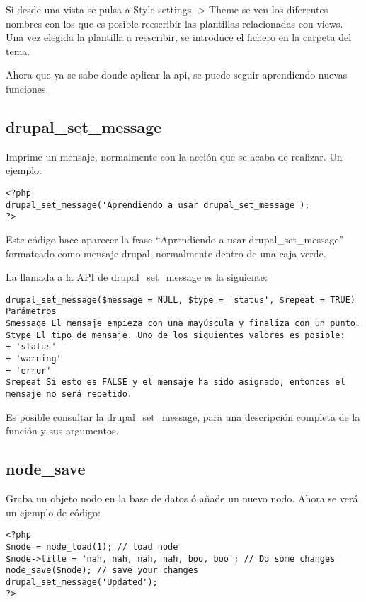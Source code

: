 \documentclass[11pt]{article}
\begin{document}
Si desde una vista se pulsa a Style settings -> Theme se ven los
diferentes nombres con los que es posible reescribir las plantillas
relacionadas con views. Una vez elegida la plantilla a reescribir, se
introduce el fichero en la carpeta del tema.

Ahora que ya se sabe donde aplicar la api, se puede seguir aprendiendo
nuevas funciones.

\subsection{drupal\_set\_message}
\label{sec-1.9}


Imprime un mensaje, normalmente con la acción que se acaba de
realizar. Un ejemplo:


\begin{verbatim}
<?php
drupal_set_message('Aprendiendo a usar drupal_set_message');
?>
\end{verbatim}



Este código hace aparecer la frase ``Aprendiendo a usar
drupal\_set\_message'' formateado como mensaje drupal, normalmente dentro
de una caja verde.

La llamada a la API de drupal\_set\_message es la siguiente:


\begin{verbatim}
drupal_set_message($message = NULL, $type = 'status', $repeat = TRUE)
Parámetros
$message El mensaje empieza con una mayúscula y finaliza con un punto.
$type El tipo de mensaje. Uno de los siguientes valores es posible:
+ 'status' 
+ 'warning' 
+ 'error' 
$repeat Si esto es FALSE y el mensaje ha sido asignado, entonces el mensaje no será repetido.
\end{verbatim}



Es posible consultar la \hyperref[api.drupal.org/api/drupal/includes--bootstrap.inc/function/drupal_set_message/7]{drupal\_set\_message}, para una descripción
completa de la función y sus argumentos.

\subsection{node\_save}
\label{sec-1.10}


Graba un objeto nodo en la base de datos ó añade un nuevo nodo. Ahora
se verá un ejemplo de código:


\begin{verbatim}
<?php
$node = node_load(1); // load node
$node->title = 'nah, nah, nah, nah, boo, boo'; // Do some changes
node_save($node); // save your changes
drupal_set_message('Updated');
?>
\end{verbatim}
\end{document}
